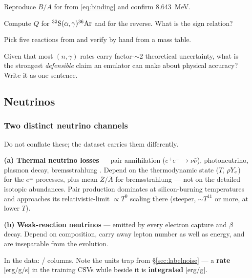\begin{selfcheck}
\item Reproduce $B/A$ for  from \eqref{eq:binding} and confirm
      8.643~MeV.
\item Compute $Q$ for $\nuc{S}{32}(\alpha,\gamma)\nuc{Ar}{36}$ and for the
      reverse. What is the sign relation?
\item Pick five reactions from  and
      verify  by hand from a mass table.
\item Given that most $(n,\gamma)$ rates carry factor-${\sim}2$ theoretical
      uncertainty, what is the strongest \emph{defensible} claim an emulator
      can make about physical accuracy? Write it as one sentence.
\end{selfcheck}

\subsection{Neutrinos}
\label{sec:neutrinos}

\subsubsection{Two distinct neutrino channels}
\label{sec:nuchannels}

Do not conflate these; the dataset carries them differently.

\textbf{(a) Thermal neutrino losses} --- pair annihilation
($e^+e^- \to \nu\bar\nu$), photoneutrino, plasmon decay, bremsstrahlung
\citep{itoh1996,kato2020}. Depend on the thermodynamic state ($T$, $\rho \Ye$)
for the $e^\pm$ processes, plus mean $\bar{Z}/\bar{A}$ for bremsstrahlung ---
not on the detailed isotopic abundances. Pair production dominates at
silicon-burning temperatures \citep{kato2020} and approaches its
relativistic-limit $\propto T^9$ scaling there (steeper, ${\sim}T^{11}$ or
more, at lower $T$).

\textbf{(b) Weak-reaction neutrinos} --- emitted by every electron capture and
$\beta$ decay. Depend on composition, carry away lepton number as well as
energy, and are inseparable from the \Ye{} evolution.

In the data:  /  columns. Note the units trap from
\S\ref{sec:labelnoise} --- a \textbf{rate} [erg/g/s] in the training CSVs while
 beside it is \textbf{integrated} [erg/g].

